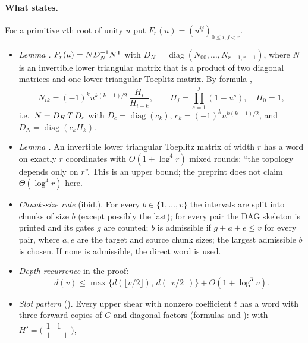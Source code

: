 \documentclass[11pt]{article}
\theoremstyle{plain}
\DeclareMathOperator{\diag}{diag}
\begin{document}
\paragraph{What  states.}
For a primitive $r$th root of unity $u$ put $F_r(u)=(u^{ij})_{0\le i,j<r}$.
\begin{itemize}
\item \emph{Lemma .} $F_r(u)=N D_N^{-1}N^{\mathsf{T}}$ with $D_N=\diag(N_{00},\dots,N_{r-1,r-1})$, where $N$ is an invertible lower triangular matrix that is a product of two diagonal matrices and one lower triangular Toeplitz matrix. By formula ,
\begin{equation}\label{eq:newton}
N_{ik}=(-1)^k u^{k(k-1)/2}\,\frac{H_i}{H_{i-k}},\qquad H_j=\prod_{s=1}^{j}(1-u^s),\quad H_0=1,
\end{equation}
i.e.\ $N=D_H\,T\,D_c$ with $D_c=\diag(c_k)$, $c_k=(-1)^k u^{k(k-1)/2}$, and $D_N=\diag(c_kH_k)$.
\item \emph{Lemma .} An invertible lower triangular Toeplitz matrix of width $r$ has a word on exactly $r$ coordinates with $O(1+\log^4 r)$ mixed rounds; ``the topology depends only on $r$''. This is an upper bound; the preprint does not claim $\Theta(\log^4 r)$ here.
\item \emph{Chunk-size rule} (ibid.). For every $b\in\{1,\dots,v\}$ the intervals are split into chunks of size $b$ (except possibly the last); for every pair the DAG skeleton is printed and its gates $g$ are counted; $b$ is admissible if $g+a+e\le v$ for every pair, where $a,e$ are the target and source chunk sizes; the largest admissible $b$ is chosen. If none is admissible, the direct word is used.
\item \emph{Depth recurrence} in the proof:
\begin{equation}\label{eq:depth-rec}
d(v)\le\max\bigl\{d(\lfloor v/2\rfloor),\,d(\lceil v/2\rceil)\bigr\}+O(1+\log^3 v).
\end{equation}
\item \emph{Slot pattern} (). Every upper shear with nonzero coefficient $t$ has a word with three forward copies of $C$ and diagonal factors (formulas  and ): with $H'=\bigl(\begin{smallmatrix}1&1\\1&-1\end{smallmatrix}\bigr)$,
\begin{equation}\label{eq:K}
\begin{gathered}

\end{gathered}
\end{equation}
\end{itemize}
\end{document}
